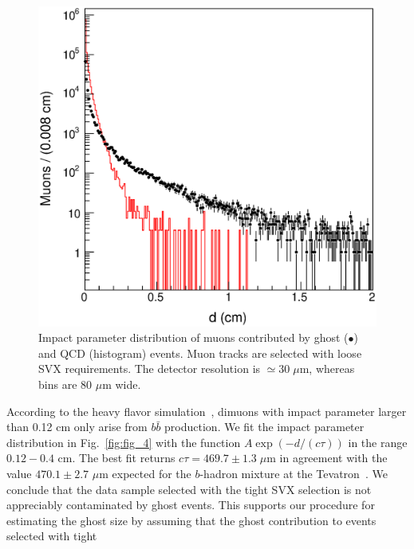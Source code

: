 \documentclass[aps,prd,preprint,floatfix,nofootinbib,superscriptaddress,showpacs,amssymb]{revtex4}
\begin{document}
 \begin{figure}[]
 \begin{center}
 \vspace{-0.2in}
 \leavevmode
 \includegraphics*[width=\textwidth]{fa0_4bis.eps}
 \caption[] {Impact parameter distribution of muons contributed by ghost
             ($\bullet$) and QCD (histogram) events. Muon tracks are
             selected with loose SVX requirements. The detector resolution
             is $\simeq 30 \; \mu$m, whereas bins are 80 $\mu$m wide.} 
 \label{fig:fig_4bis}
 \end{center}
 \end{figure}
 According to the heavy flavor simulation~\cite{bbxs}, dimuons with impact
 parameter larger than 0.12 cm only arise from $b\bar{b}$ production. We
 fit the impact parameter distribution in Fig.~\ref{fig:fig_4} with the 
 function $A \exp (-d/(c \tau))$ in the range $0.12 - 0.4$ cm. The best
 fit returns $c\tau= 469.7 \pm 1.3 \; \mu$m in agreement with the value
 $470.1 \pm 2.7$ $\mu$m  expected for the $b$-hadron mixture at the
 Tevatron~\cite{pdg}. We conclude that the data sample selected with the
 tight SVX selection is not appreciably contaminated by ghost 
 events. This supports our procedure for estimating the ghost size
 by assuming that the ghost contribution to events selected with tight
\end{document}
